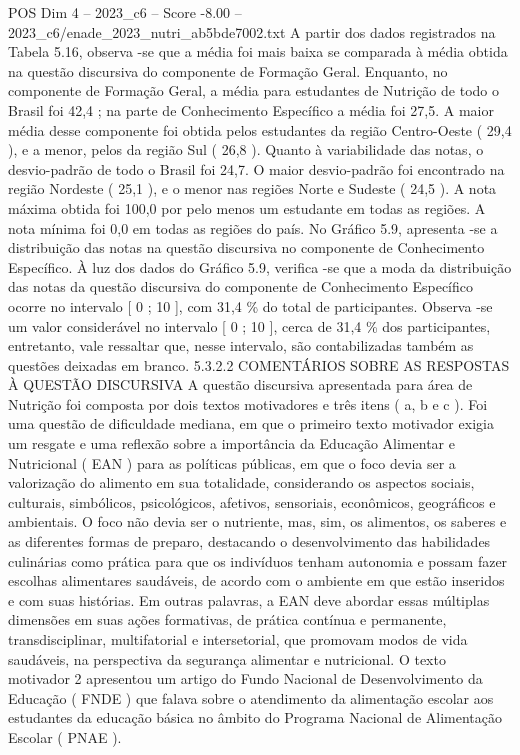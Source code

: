\begin{textsample}{POS Dim 4 – 2023\_c6 – Score -8.00 – 2023\_c6/enade\_2023\_nutri\_ab5bde7002.txt}
A partir dos dados registrados na Tabela 5.16, observa -se que a média foi mais baixa se comparada à média obtida na questão discursiva do componente de Formação Geral.
Enquanto, no componente de Formação Geral, a média para estudantes de Nutrição de todo o Brasil foi 42,4 ; na parte de Conhecimento Específico a média foi 27,5.
A maior média desse componente foi obtida pelos estudantes da região Centro-Oeste ( 29,4 ), e a menor, pelos da região Sul ( 26,8 ).
Quanto à variabilidade das notas, o desvio-padrão de todo o Brasil foi 24,7.
O maior desvio-padrão foi encontrado na região Nordeste ( 25,1 ), e o menor nas regiões Norte e Sudeste ( 24,5 ).
A nota máxima obtida foi 100,0 por pelo menos um estudante em todas as regiões.
A nota mínima foi 0,0 em todas as regiões do país.
No Gráfico 5.9, apresenta -se a distribuição das notas na questão discursiva no componente de Conhecimento Específico.
À luz dos dados do Gráfico 5.9, verifica -se que a moda da distribuição das notas da questão discursiva do componente de Conhecimento Específico ocorre no intervalo [ 0 ; 10 ], com 31,4 \% do total de participantes.
Observa -se um valor considerável no intervalo [ 0 ; 10 ], cerca de 31,4 \% dos participantes, entretanto, vale ressaltar que, nesse intervalo, são contabilizadas também as questões deixadas em branco. 5.3.2.2 COMENTÁRIOS SOBRE AS RESPOSTAS À QUESTÃO DISCURSIVA A questão discursiva apresentada para área de Nutrição foi composta por dois textos motivadores e três itens ( a, b e c ).
Foi uma questão de dificuldade mediana, em que o primeiro texto motivador exigia um resgate e uma reflexão sobre a importância da Educação Alimentar e Nutricional ( EAN ) para as políticas públicas, em que o foco devia ser a valorização do alimento em sua totalidade, considerando os aspectos sociais, culturais, simbólicos, psicológicos, afetivos, sensoriais, econômicos, geográficos e ambientais.
O foco não devia ser o nutriente, mas, sim, os alimentos, os saberes e as diferentes formas de preparo, destacando o desenvolvimento das habilidades culinárias como prática para que os indivíduos tenham autonomia e possam fazer escolhas alimentares saudáveis, de acordo com o ambiente em que estão inseridos e com suas histórias.
Em outras palavras, a EAN deve abordar essas múltiplas dimensões em suas ações formativas, de prática contínua e permanente, transdisciplinar, multifatorial e intersetorial, que promovam modos de vida saudáveis, na perspectiva da segurança alimentar e nutricional.
O texto motivador 2 apresentou um artigo do Fundo Nacional de Desenvolvimento da Educação ( FNDE ) que falava sobre o atendimento da alimentação escolar aos estudantes da educação básica no âmbito do Programa Nacional de Alimentação Escolar ( PNAE ).

\end{textsample}
